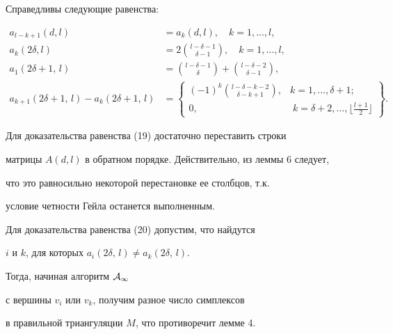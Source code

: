 \begin{lem}


Справедливы следующие равенства:


\begin{align}


a_{l-k+1}(d,l)&= a_k(d,l),\quad k=1,\dotsc,l,\\


a_k(2\delta, l)&=2\binom{l-\delta-1}{\delta-1},\quad


k=1,\dotsc,l,\\


a_1(2\delta+1,\,l)&=\binom{l-\delta-1}{\delta}+


\binom{l-\delta-2}{\delta-1},\\


a_{k+1}(2\delta+1,\,l)-a_k(2\delta+1,\,l)&=


\left\{


\begin{matrix}


(-1)^k\binom{l-\delta-k-2}{\delta-k+1},& k=1,\dotsc,\delta+1;{\phantom{+1}}\\


0, & {\;}k=\delta+2,\dotsc,\lfloor\frac{l+1}{2}\rfloor


\end{matrix}


\right\}.


\end{align}


\end{lem}





Для доказательства равенства (19) достаточно переставить строки


матрицы $A(d,l)$ в обратном порядке. Действительно, из леммы 6 следует,


что это равносильно некоторой перестановке ее столбцов, т.к.


условие четности Гейла останется выполненным.





Для доказательства равенства (20) допустим, что найдутся


$i$ и $k$, для которых $a_i(2\delta,\,l)\ne a_k(2\delta,\,l)$.


Тогда, начиная алгоритм $\cal A_1$


с вершины $v_i$ или $v_k$, получим разное число симплексов


в правильной триангуляции $M$, что противоречит лемме 4.


